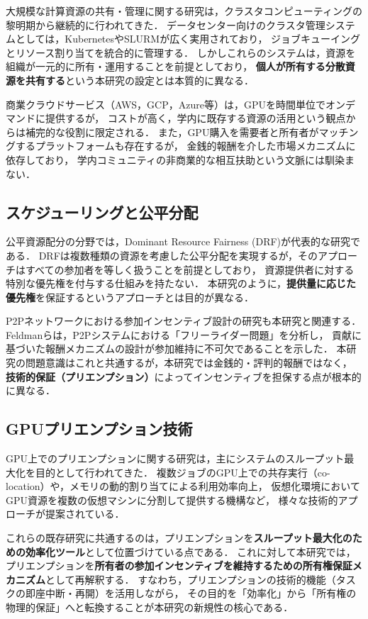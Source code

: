 \documentclass[12pt,a4paper]{jsarticle}
\begin{document}
大規模な計算資源の共有・管理に関する研究は，クラスタコンピューティングの黎明期から継続的に行われてきた．
データセンター向けのクラスタ管理システムとしては，KubernetesやSLURMが広く実用されており，
ジョブキューイングとリソース割り当てを統合的に管理する\cite{armbrust2010view}．
しかしこれらのシステムは，資源を組織が一元的に所有・運用することを前提としており，
\textbf{個人が所有する分散資源を共有する}という本研究の設定とは本質的に異なる．

商業クラウドサービス（AWS，GCP，Azure等）は，GPUを時間単位でオンデマンドに提供するが，
コストが高く，学内に既存する資源の活用という観点からは補完的な役割に限定される\cite{buyya2009cloud}．
また，GPU購入を需要者と所有者がマッチングするプラットフォームも存在するが，
金銭的報酬を介した市場メカニズムに依存しており，
学内コミュニティの非商業的な相互扶助という文脈には馴染まない．

\subsection{スケジューリングと公平分配}

公平資源配分の分野では，Dominant Resource Fairness (DRF)\cite{ghodsi2011dominant}が代表的な研究である．
DRFは複数種類の資源を考慮した公平分配を実現するが，そのアプローチはすべての参加者を等しく扱うことを前提としており，
資源提供者に対する特別な優先権を付与する仕組みを持たない．
本研究のように，\textbf{提供量に応じた優先権}を保証するというアプローチとは目的が異なる．

P2Pネットワークにおける参加インセンティブ設計の研究も本研究と関連する．
Feldmanら\cite{feldman2004robust}は，P2Pシステムにおける「フリーライダー問題」を分析し，
貢献に基づいた報酬メカニズムの設計が参加維持に不可欠であることを示した．
本研究の問題意識はこれと共通するが，本研究では金銭的・評判的報酬ではなく，
\textbf{技術的保証（プリエンプション）}によってインセンティブを担保する点が根本的に異なる．

\subsection{GPUプリエンプション技術}

GPU上でのプリエンプションに関する研究は，主にシステムのスループット最大化を目的として行われてきた．
複数ジョブのGPU上での共存実行（co-location）や，メモリの動的割り当てによる利用効率向上，
仮想化環境においてGPU資源を複数の仮想マシンに分割して提供する機構など，
様々な技術的アプローチが提案されている\cite{jeon2019analysis}．

これらの既存研究に共通するのは，プリエンプションを\textbf{スループット最大化のための効率化ツール}として位置づけている点である．
これに対して本研究では，プリエンプションを\textbf{所有者の参加インセンティブを維持するための所有権保証メカニズム}として再解釈する．
すなわち，プリエンプションの技術的機能（タスクの即座中断・再開）を活用しながら，
その目的を「効率化」から「所有権の物理的保証」へと転換することが本研究の新規性の核心である．
\end{document}
